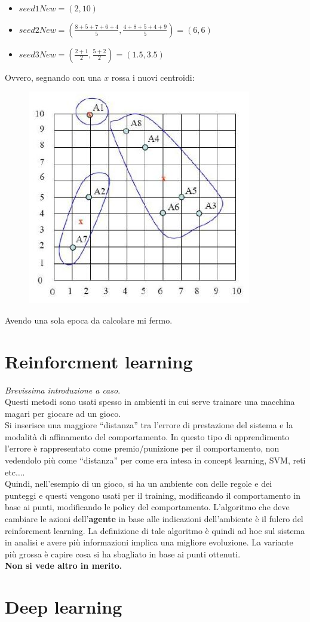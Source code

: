 \documentclass[a4paper,12pt, oneside]{book}
\begin{document}
\begin{esercizio}
\begin{itemize}
    \item $seed1New=(2,10)$
    \item $seed2New=\left(\frac{8+5+7+6+4}{5},\frac{4+8+5+4+9}{5}\right)=(6,6)$
    \item $seed3New=\left(\frac{2+1}{2},\frac{5+2}{2}\right)=(1.5,3.5)$
  \end{itemize}
  Ovvero, segnando con una $x$ rossa i nuovi centroidi:
  \begin{figure}[H]
    \centering
    \includegraphics[scale = 0.4]{img/clue3.jpg}
  \end{figure}
  Avendo una sola epoca da calcolare mi fermo.
\end{esercizio}
\chapter{Reinforcment learning}
\textit{Brevissima introduzione a caso}.\\
Questi metodi sono usati spesso in ambienti in cui serve trainare una macchina
magari per giocare ad un gioco.\\
Si inserisce una maggiore ``distanza'' tra l'errore di prestazione del sistema e
la modalità di affinamento del comportamento. In questo tipo di apprendimento
l'errore è rappresentato come premio/punizione per il comportamento, non
vedendolo più come ``distanza'' per come era intesa in concept learning, SVM,
reti etc$\ldots$.\\
Quindi, nell'esempio di un gioco, si ha un ambiente con delle regole e dei
punteggi e questi vengono usati per il training, modificando il comportamento in
base ai punti, modificando le policy del comportamento. L'algoritmo che deve
cambiare le azioni dell'\textbf{agente} in base alle indicazioni dell'ambiente è
il fulcro del reinforcment learning. La definizione di tale algoritmo è quindi
ad hoc sul sistema in analisi e avere più informazioni implica una migliore
evoluzione. La variante più grossa è capire cosa si ha sbagliato in base ai
punti ottenuti.  \\
\textbf{Non si vede altro in merito.}
\chapter{Deep learning}
\end{document}
